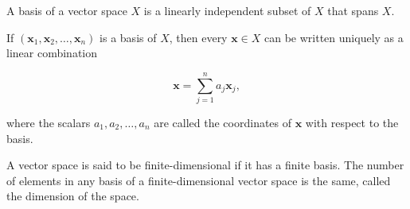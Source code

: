 A basis of a vector space $X$ is a linearly independent subset of $X$ that spans $X$.

If $(\mathbf{x}_1, \mathbf{x}_2, \ldots, \mathbf{x}_n)$ is a basis of $X$, then every $\mathbf{x} \in X$ can be written uniquely as a linear combination

$$\mathbf{x} = \sum_{j=1}^{n} a_j \mathbf{x}_j,$$

where the scalars $a_1, a_2, \ldots, a_n$ are called the coordinates of $\mathbf{x}$ with respect to the basis.

A vector space is said to be finite-dimensional if it has a finite basis. The number of elements in any basis of a finite-dimensional vector space is the same, called the dimension of the space.

